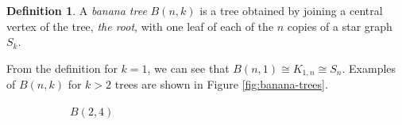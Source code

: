 \documentclass[10pt]{article}
\theoremstyle{definition}
\newtheorem{definition}{Definition}
\begin{document}
\begin{definition}
  A \textit{banana tree} $B(n, k)$ is a tree obtained by joining a central vertex of the tree, \textit{the root}, with one leaf of each of the $n$ copies of a star graph $S_k$.
\end{definition}
From the definition for $k = 1$, we can see that $B(n,1) \cong K_{1, n} \cong S_n$. Examples of $B(n, k)$ for $k > 2 $ trees are shown in Figure \ref{fig:banana-trees}.
\begin{figure}[H]
  \centering
  \begin{subfigure}{0.125\textwidth}
    \centering
    \caption*{$B(2, 4)$}
  \end{subfigure}
  \hspace*{1cm}
  \begin{subfigure}{0.15\textwidth}
    \centering
\end{subfigure}
\end{figure}
\end{document}
